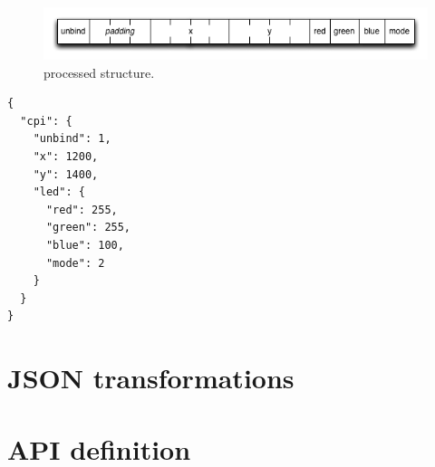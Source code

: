 \documentclass[12pt]{report}
\begin{document}
\begin{figure}[htbp] %
   \centering
   \includegraphics[width=6in]{bytearray.png} 
\caption{processed structure.}
\label{fig:bytearray}
\end{figure}

\begin{verbatim}
{
  "cpi": {
    "unbind": 1,
    "x": 1200,
    "y": 1400,
    "led": {
      "red": 255,
      "green": 255,
      "blue": 100,
      "mode": 2
    }
  }
}
\end{verbatim}


\section{JSON transformations}

\section{API definition}
\end{document}
